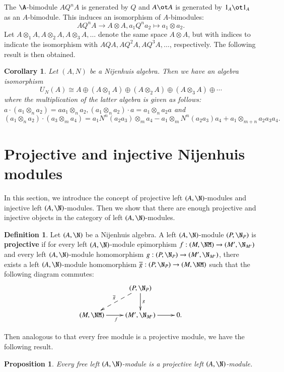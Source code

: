 \documentclass[12pt]{amsart}
\newtheorem{coro}[theorem]{Corollary}
\newtheorem{prop}[theorem]{Proposition}
\theoremstyle{definition}
\newtheorem{defn}[theorem]{Definition}
\begin{document}
The $\A$-bimodule $AQ^nA$ is generated by $Q$ and $A \ot A$ is generated by $1_A \ot 1_A$ as an $A$-bimodule. This induces an isomorphism of $A$-bimodules: $$AQ^nA\rightarrow A\otimes A, a_1Q^na_2\mapsto a_1\otimes a_2.$$
Let $A \otimes_1 A, A \otimes_2 A, A \otimes_3 A, \ldots$ denote the same space $A \otimes A$, but with indices to indicate the isomorphism with $AQA, AQ^2A, AQ^3A, \ldots$, respectively. The following result is then obtained.
\begin{coro} 
Let $(A,N)$ be a Nijenhuis algebra. Then   
we have an algebra isomorphism 
$$U_N(A)\cong A\oplus (A \otimes_1 A)\oplus (A \otimes_2 A)\oplus (A \otimes_3 A)\oplus \cdots$$
where the multiplication of the latter algebra  is given as follows:$a\cdot(a_1\otimes_n a_2)=aa_1\otimes_n a_2, (a_1\otimes_n a_2)\cdot a=a_1\otimes_n  a_2a$ and
\begin{equation*}
(a_1\otimes_n a_2)\cdot (a_3\otimes_m a_4)= 
a_1 N^n(a_2 a_3)\otimes_m a_4- a_1\otimes_m N^n(a_2 a_3)a_4 +a_1\otimes_{m+n} a_2 a_3a_4. 
\end{equation*} 
\end{coro}


\section{Projective and injective Nijenhuis modules}

In this section, we introduce the concept of projective left $(A,\N)$-modules and injective left $(A,\N)$-modules. Then we show that there are enough projective and injective objects in the category of left $(A,\N)$-modules.

\begin{defn}
Let $(A,\N)$ be a Nijenhuis algebra. A left $(A,\N)$-module $(P, \N_P)$ is {\bf projective} if for every left $(A,\N)$-module epimorphism $f:(M,\NM)\to (M',\N_{M'})$ and every left $(A,\N)$-module homomorphism $g:(P,\N_P)\to (M',\N_{M'})$, there exists a left $(A,\N)$-module homomorphism $\overline{g}:(P,\N_P)\to (M,\NM)$ such that the following diagram commutes:
$$
\xymatrix{
&(P,\N_P)\ar^{g}[d] \ar@{-->}_{\overline{g}}[dl]&\\
(M,\NM)\ar_{f}[r]&(M',\N_{M'})\ar[r]&0.}
$$
\end{defn}

Then analogous to that every free module is a projective module, we have the following result.
\begin{prop}
Every free left $(A,\N)$-module is a projective left $(A,\N)$-module.
\end{prop}
\end{document}
